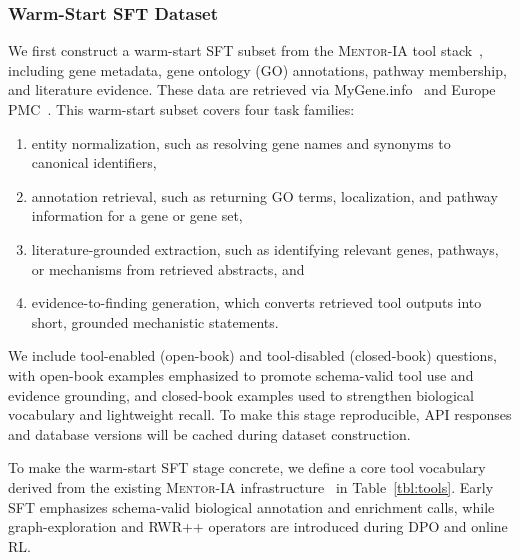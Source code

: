 \documentclass[thesis,letterpaper,12pt]{utthesis}
\begin{document}
\subsubsection{Warm-Start SFT Dataset} 
We first construct a warm-start SFT subset from the \textsc{Mentor-IA} tool stack~\cite{mentor-ia}, including gene metadata, gene ontology (GO) annotations, pathway membership, and literature evidence. These data are retrieved via MyGene.info~\cite{mygene.info} and Europe PMC~\cite{europepmc}. This warm-start subset covers four task families:
\begin{enumerate}
    \item entity normalization, such as resolving gene names and synonyms to canonical identifiers,
    \item annotation retrieval, such as returning GO terms, localization, and pathway information for a gene or gene set,
    \item literature-grounded extraction, such as identifying relevant genes, pathways, or mechanisms from retrieved abstracts, and
    \item evidence-to-finding generation, which converts retrieved tool outputs into short, grounded mechanistic statements.
\end{enumerate}

We include tool-enabled (open-book) and tool-disabled (closed-book) questions, with open-book examples emphasized to promote schema-valid tool use and evidence grounding, and closed-book examples used to strengthen biological vocabulary and lightweight recall. To make this stage reproducible, API responses and database versions will be cached during dataset construction.

To make the warm-start SFT stage concrete, we define a core tool vocabulary derived from the existing \textsc{Mentor-IA} infrastructure~\cite{mentor-ia} in Table~\ref{tbl:tools}. Early SFT emphasizes schema-valid biological annotation and enrichment calls, while graph-exploration and RWR++ operators are introduced during DPO and online RL.
\end{document}
